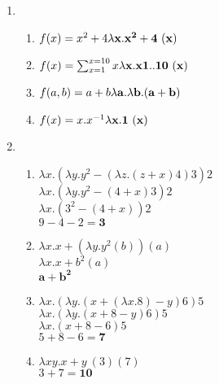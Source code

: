 \documentclass{../sftex/sftex}
\begin{document}
\begin{enumerate}\bfseries
    \item
    \begin{enumerate}
        \item $f(x) = x^2 + 4 \\
            \mathbf{\lambda x.x^2 + 4\ (x)}$
        \item $f(x) = \sum_{x=1}^{x=10} x \\
            \mathbf{\lambda x.x{1..10}\  (x)}$
        \item $f(a, b) = a + b \\
            \mathbf{\lambda a.\lambda b.(a+b)}$
        \item $f(x) = x.x^{-1} \\
            \mathbf{\lambda x.1\ (x)}$
    \end{enumerate}

    \item
    \begin{enumerate}
        \item $\lambda x.(\lambda y.y^2 - (\lambda z.(z+x)4)3)2$ \\
            $\lambda x.(\lambda y.y^2 - (4+x)3)2$ \\
            $\lambda x.(3^2 - (4+x))2$ \\
            $9 - 4 - 2 = \mathbf{3}$
        \item $\lambda x.x + (\lambda y.y^2(b))(a)$ \\
            $\lambda x.x + b^2 (a)$ \\
            $\mathbf{a + b^2}$
        \item $\lambda x.(\lambda y.(x + (\lambda x.8) - y)6)5$ \\
            $\lambda x.(\lambda y.(x + 8 - y)6)5$ \\
            $\lambda x.(x + 8 - 6)5$ \\
            $5 + 8 - 6 = \mathbf{7}$
        \item $\lambda xy.x + y\ (3)(7)$ \\
            $3 + 7 = \mathbf{10}$
    \end{enumerate}


\end{enumerate}
\end{document}
